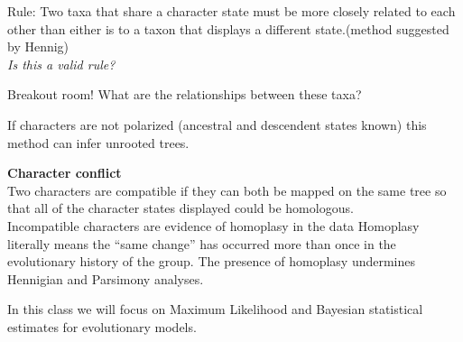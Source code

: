 \documentclass{beamer}
\begin{document}






\begin{frame}
Rule: Two taxa that share a character state must be more
closely related to each other than either is to a taxon that
displays a different state.(method suggested by Hennig)\\ 
\textit{Is this a valid rule?}
\end{frame}
% 





\begin{frame}
Breakout room! What are the relationships between these taxa?
\end{frame}






\begin{frame}
If characters are not polarized (ancestral and descendent states known)
this method can infer unrooted trees. \\
\medskip
\end{frame}





\begin{frame}
\textbf{Character conflict}\\
Two characters are compatible if they can both be mapped on the same
tree so that all of the character states displayed could be homologous.\\
\pause
\medskip
Incompatible characters are evidence of homoplasy in the data
\pause
\medskip
Homoplasy literally means the “same change” has occurred more than once
in the evolutionary history of the group.
The presence of homoplasy undermines Hennigian and Parsimony analyses.
\end{frame}






\begin{frame}
In this class we will focus on Maximum Likelihood and Bayesian statistical estimates for evolutionary models.
\end{frame}
\end{document}
